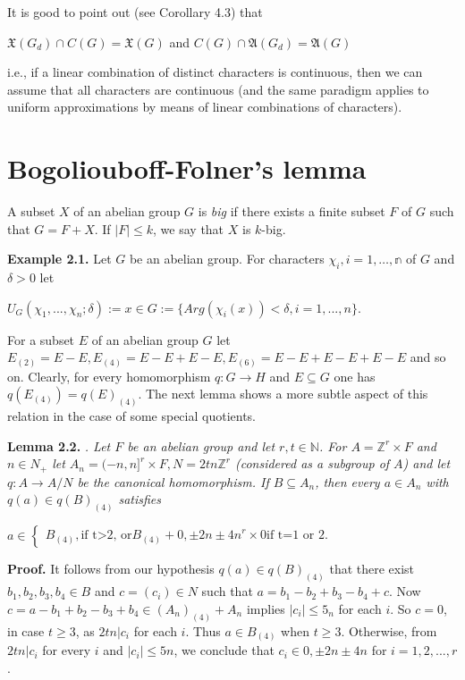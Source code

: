 \documentclass[12pt]{article}
\begin{document}
        It is good to point out (see Corollary 4.3) that


        $\mathfrak{X}(G_d) \cap C(G) = \mathfrak{X}(G)$ and $C(G) \cap \mathfrak{A}(G_d) = \mathfrak{A}(G)$


        i.e., if a linear combination of distinct characters is continuous, then we can assume that all characters are continuous (and
    the same paradigm applies to uniform approximations by means of linear combinations of characters).


    \section{Bogoliouboff-Folner's lemma}


        A subset $X$ of an abelian group $G$ is \emph{big} if there exists a finite subset $F$ of $G$ such that $G = F + X$. If $|F | \leqslant k$, we say that
    $X$ is $k$-big.


    \textbf{Example 2.1.} Let $G$ be an abelian group. For characters $\chi_i, i=1,\dots,\mathbb{n}$ of $G$ and $\delta > 0$ let


    $U_G(\chi_1,...,\chi_n; \delta) := x \in G:= \{Arg(\chi_i(x)) < \delta, i = 1,...,n\}$.


        For a subset $E$ of an abelian group $G$ let $E_{(2)} = E - E, E_{(4)} = E - E + E - E, E_{(6)} = E - E + E - E + E - E$ and so on.
    Clearly, for every homomorphism $q : G \to H$ and $E \subseteq G$ one has $q(E_{(4)}) = q(E)_{(4)}$. The next lemma shows a more subtle
    aspect of this relation in the case of some special quotients.
    
    
    \textbf{Lemma 2.2.} \emph{. Let $F$ be an abelian group and let $r,t \in \mathbb{N}$. For $A = \mathbb{Z}^r \times F$ and $n \in N_+$ let $A_n = (-n,n]^r \times F, N = 2tn\mathbb{Z}^r$ (considered as
    a subgroup of $A$) and let $q : A \to A/N$ be the canonical homomorphism. If $B \subseteq A_n$, then every $a \in A_n$ with $q(a) \in q(B)_{(4)}$ satisfies}


    $a \in \begin{cases}
        B_(4), \text{if t>2, or}
        B_(4)+{0, \pm 2n \pm 4n}^r \times {0} \text{if t=1 or 2.}
    \end{cases}$


    \textbf{Proof.} It follows from our hypothesis $q(a) \in q(B)_{(4)}$ that there exist $b_1, b_2, b_3, b_4 \in B$ and $c = (c_i) \in N$ such that $a = b_1 -
    b_2 + b_3 - b_4 + c$. Now $c = a - b_1 + b_2 - b_3 + b_4 \in (A_n)_{(4)} + A_n$ implies $|c_i| \leqslant 5_n$ for each $i$. So $c = 0$, in case $t \geqslant 3$, as $2tn|c_i$
    for each $i$. Thus $a \in B_{(4)}$ when $t \geqslant 3$. Otherwise, from $2tn|c_i$ for every $i$ and $|c_i| \leqslant 5n$, we conclude that $c_i \in {0,\pm 2n \pm 4n}$
    for $i = 1, 2,...,r$. 
\end{document}
